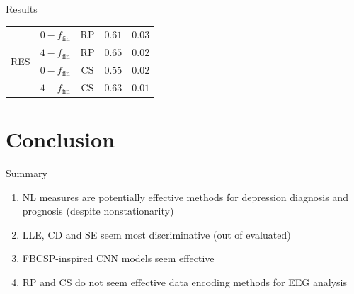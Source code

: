 \documentclass{beamer}
\begin{document}
\begin{frame}{Results}
\begin{table}[tbp]
{\begin{tabular}{|c|c|c|c|c|}
\multirow{4}{*}{RES} & $0-f_{\text{fin}}$ & RP &   $0.61$ & $0.03$ \\ \cline{2-5}               
                     & $4-f_{\text{fin}}$ & RP &       $\mathbf{0.65}$ & $0.02$    \\ \cline{2-5}   
                     & $0-f_{\text{fin}}$ & CS &      $0.55$ & $0.02$ \\ \cline{2-5}               
                     & $4-f_{\text{fin}}$ & CS &      $0.63$ & $0.01$ \\ \hline               
\end{tabular}
}
\end{table}
\end{frame}


\section{Conclusion}


\begin{frame}{Summary}
    \centering
    \begin{enumerate}
        \item<1-> NL measures are potentially effective methods for depression diagnosis and prognosis {\scriptsize(despite nonstationarity)}
        \item<2-> LLE, CD and SE seem most discriminative {\scriptsize (out of evaluated)}
        \item<3-> FBCSP-inspired CNN models seem effective
        \item<4-> {\scriptsize RP and CS do not seem effective data encoding methods for EEG analysis}
    \end{enumerate}
    
\end{frame}

\end{document}
